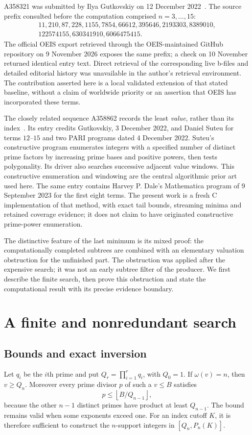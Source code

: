 \documentclass[11pt]{article}
\theoremstyle{remark}
\begin{document}
A358321 was submitted by Ilya Gutkovskiy on 12 December 2022~\cite{oeis321}.
The source prefix consulted before the computation comprised $n=3,\ldots,15$:
\begin{multline}\label{eq:prefix}
11,210,87,228,1155,7854,66612,395646,2193303,8389010,\\
122574155,630341910,6066475415.
\end{multline}
The official OEIS export retrieved through the OEIS-maintained GitHub
repository on 9 November 2026 exposes the same prefix; a check on
10 November returned identical entry text. Direct retrieval of the
corresponding live b-files and detailed editorial history was unavailable
in the author's retrieval environment. The contribution asserted here is a
local validated extension of that stated baseline, without a claim of
worldwide priority or an assertion that OEIS has incorporated these terms.

The closely related sequence A358862 records the least \emph{value}, rather
than its index~\cite{oeis862}. Its entry credits Gutkovskiy, 3 December 2022,
and Daniel Suteu for terms $12$--$15$ and two PARI programs dated
4 December 2022. Suteu's constructive program enumerates integers with a
specified number of distinct prime factors by increasing prime bases and
positive powers, then tests polygonality. Its driver also searches successive adjacent value windows. This
constructive enumeration and windowing are the central algorithmic
prior art used here. The same entry contains Harvey P. Dale's Mathematica
program of 9 September 2023 for the first eight terms. The present work is
a fresh C implementation of that method, with exact tail bounds, streaming
minima and retained coverage evidence; it does not claim to have originated
constructive prime-power enumeration.

The distinctive feature of the last minimum is its mixed proof: the
computationally completed subtrees are combined with an elementary
valuation obstruction for the unfinished part. The obstruction was applied
after the expensive search; it was not an early subtree filter of the
producer. We first describe the finite search, then prove this obstruction
and state the computational result with its precise evidence boundary.

\section{A finite and nonredundant search}\label{sec:method}
\subsection{Bounds and exact inversion}
Let $q_i$ be the $i$th prime and put $Q_r=\prod_{i=1}^r q_i$, with $Q_0=1$.
If $\omega(v)=n$, then $v\geq Q_n$. Moreover every prime divisor $p$ of such
a $v\leq B$ satisfies
\begin{equation}\label{eq:cap}
 p\leq\left\lfloor B/Q_{n-1}\right\rfloor,
\end{equation}
because the other $n-1$ distinct primes have product at least $Q_{n-1}$.
The bound remains valid when some exponents exceed one.
For an index cutoff $K$, it is therefore sufficient to construct the
$n$-support integers in $[Q_n,P_n(K)]$.
\end{document}
